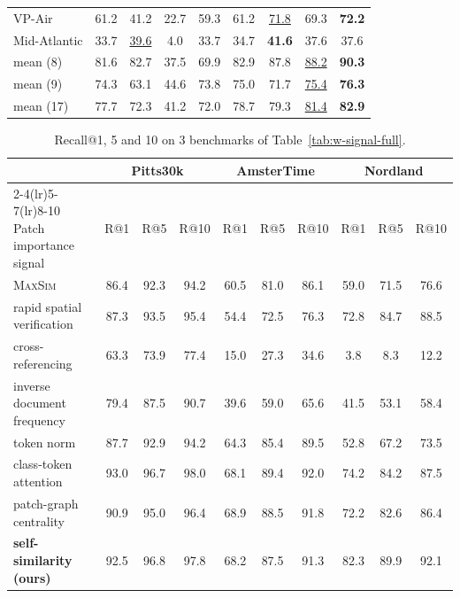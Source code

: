 \begin{table}[H]
{\begin{tabular}{l cccccccc}
VP-Air & 61.2 & 41.2 & 22.7 & 59.3 & 61.2 & \underline{71.8} & 69.3 & \textbf{72.2} \\
Mid-Atlantic & 33.7 & \underline{39.6} & 4.0 & 33.7 & 34.7 & \textbf{41.6} & 37.6 & 37.6 \\
\midrule
mean (8) & 81.6 & 82.7 & 37.5 & 69.9 & 82.9 & 87.8 & \underline{88.2} & \textbf{90.3} \\
mean (9) & 74.3 & 63.1 & 44.6 & 73.8 & 75.0 & 71.7 & \underline{75.4} & \textbf{76.3} \\
mean (17) & 77.7 & 72.3 & 41.2 & 72.0 & 78.7 & 79.3 & \underline{81.4} & \textbf{82.9} \\
\bottomrule
\end{tabular}}
\end{table}

\begin{table}[H]
\caption{Recall@1, 5 and 10 on 3 benchmarks of Table~\ref{tab:w-signal-full}.}
\label{tab:recallk-signal}
\centering
{\scriptsize\setlength{\tabcolsep}{3.5pt}
\begin{tabular}{l ccc ccc ccc}
\toprule
& \multicolumn{3}{c}{Pitts30k} & \multicolumn{3}{c}{AmsterTime} & \multicolumn{3}{c}{Nordland} \\
\cmidrule(lr){2-4}\cmidrule(lr){5-7}\cmidrule(lr){8-10}
Patch importance signal & R@1 & R@5 & R@10 & R@1 & R@5 & R@10 & R@1 & R@5 & R@10 \\
\midrule
\textsc{MaxSim} & 86.4 & 92.3 & 94.2 & 60.5 & 81.0 & 86.1 & 59.0 & 71.5 & 76.6 \\
\midrule
rapid spatial verification & 87.3 & 93.5 & 95.4 & 54.4 & 72.5 & 76.3 & 72.8 & 84.7 & 88.5 \\
cross-referencing & 63.3 & 73.9 & 77.4 & 15.0 & 27.3 & 34.6 & 3.8 & 8.3 & 12.2 \\
inverse document frequency & 79.4 & 87.5 & 90.7 & 39.6 & 59.0 & 65.6 & 41.5 & 53.1 & 58.4 \\
token norm & 87.7 & 92.9 & 94.2 & 64.3 & 85.4 & 89.5 & 52.8 & 67.2 & 73.5 \\
class-token attention & 93.0 & 96.7 & 98.0 & 68.1 & 89.4 & 92.0 & 74.2 & 84.2 & 87.5 \\
patch-graph centrality & 90.9 & 95.0 & 96.4 & 68.9 & 88.5 & 91.8 & 72.2 & 82.6 & 86.4 \\
\textbf{self-similarity (ours)} & 92.5 & 96.8 & 97.8 & 68.2 & 87.5 & 91.3 & 82.3 & 89.9 & 92.1 \\
\bottomrule
\end{tabular}}
\end{table}


